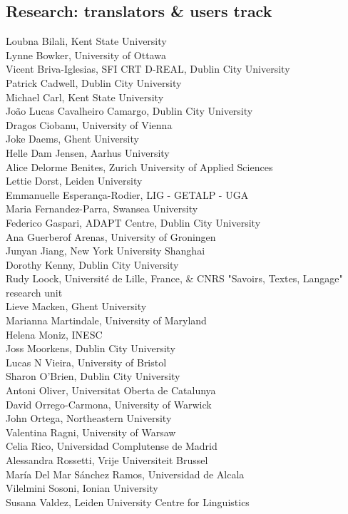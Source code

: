 \documentclass[a4paper,11pt,twoside]{book}
\begin{document}
\subsection*{Research: translators \& users track}
\noindent Loubna Bilali, Kent State University\\
\noindent Lynne Bowker, University of Ottawa\\
\noindent Vicent Briva-Iglesias, SFI CRT D-REAL, Dublin City University\\
\noindent Patrick Cadwell, Dublin City University\\
\noindent Michael Carl, Kent State University\\
\noindent João Lucas Cavalheiro Camargo, Dublin City University\\
\noindent Dragos Ciobanu, University of Vienna\\
\noindent Joke Daems, Ghent University\\
\noindent Helle Dam Jensen, Aarhus University\\
\noindent Alice Delorme Benites, Zurich University of Applied Sciences\\
\noindent Lettie Dorst, Leiden University\\
\noindent Emmanuelle Esperança-Rodier, LIG - GETALP - UGA\\
\noindent Maria Fernandez-Parra, Swansea University\\
\noindent Federico Gaspari, ADAPT Centre, Dublin City University\\
\noindent Ana Guerberof Arenas, University of Groningen\\
\noindent Junyan Jiang, New York University Shanghai\\
\noindent Dorothy Kenny, Dublin City University\\
\noindent Rudy Loock, Université de Lille, France, \& CNRS "Savoirs, Textes, Langage" research unit\\
\noindent Lieve Macken, Ghent University\\
\noindent Marianna Martindale, University of Maryland\\
\noindent Helena Moniz, INESC\\
\noindent Joss Moorkens, Dublin City University\\
\noindent Lucas N Vieira, University of Bristol\\
\noindent Sharon O'Brien, Dublin City University\\
\noindent Antoni Oliver, Universitat Oberta de Catalunya\\
\noindent David Orrego-Carmona, University of Warwick\\
\noindent John Ortega, Northeastern University\\
\noindent Valentina Ragni, University of Warsaw\\
\noindent Celia Rico, Universidad Complutense de Madrid\\
\noindent Alessandra Rossetti, Vrije Universiteit Brussel\\
\noindent María Del Mar Sánchez Ramos, Universidad de Alcala\\
\noindent Vilelmini Sosoni, Ionian University\\
\noindent Susana Valdez, Leiden University Centre for Linguistics
\end{document}
